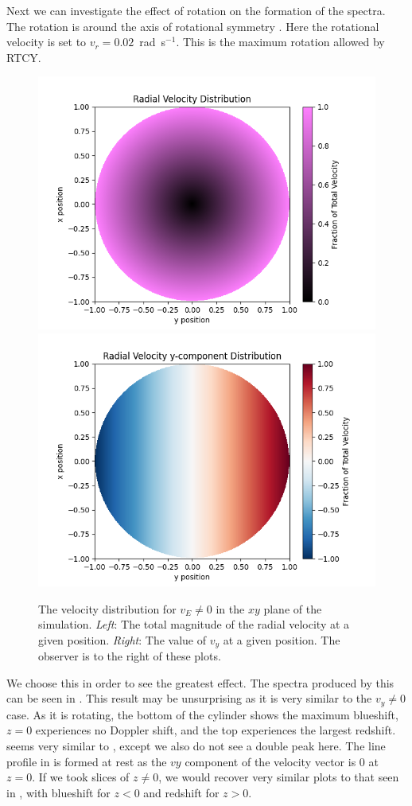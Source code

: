 Next we can investigate the effect of rotation on the formation of the spectra. The rotation is around the axis of rotational symmetry . Here the rotational velocity is set to $v_r=0.02$~rad~s$^{-1}$. This is the maximum rotation allowed by RTCY.
\begin{figure}
    \centering
    \includegraphics[width=0.45\linewidth]{./03Modelling2D/figs/vetot.png}
    \includegraphics[width=0.45\linewidth]{./03Modelling2D/figs/vey.png}
    \caption[The velocity distribution for $v_E\neq0$ in the $xy$ plane of the simulation.]{The velocity distribution for $v_E\neq0$ in the $xy$ plane of the simulation. \textit{Left}: The total magnitude of the radial velocity at a given position. \textit{Right}: The value of $v_y$ at a given position. The observer is to the right of these plots.}
    \label{velmode}
\end{figure}

We choose this in order to see the greatest effect. The spectra produced by this can be seen in . This result may be unsurprising as it is very similar to the $v_y\neq0$ case.  As it is rotating, the bottom of the cylinder shows the maximum blueshift, $z=0$ experiences no Doppler shift, and the top experiences the largest redshift.  seems very similar to , except we also do not see a double peak here. The line profile in  is formed at rest as the $vy$ component of the velocity vector is 0 at $z=0$. If we took slices of $z\neq0$, we would recover very similar plots to that seen in , with blueshift for $z<0$ and redshift for $z>0$. 

